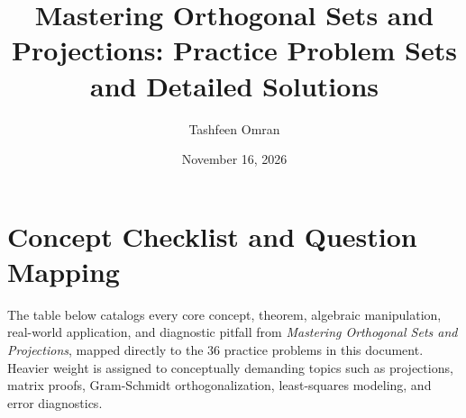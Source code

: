 \documentclass[11pt, letterpaper]{article}
\title{Mastering Orthogonal Sets and Projections: Practice Problem Sets and Detailed Solutions}
\author{Tashfeen Omran}
\date{November 16, 2026}
\theoremstyle{definition}
\theoremstyle{remark}
\begin{document}
\maketitle
\tableofcontents
\newpage

\section{Concept Checklist and Question Mapping}

The table below catalogs every core concept, theorem, algebraic manipulation, real-world application, and diagnostic pitfall from \textit{Mastering Orthogonal Sets and Projections}, mapped directly to the $36$ practice problems in this document. Heavier weight is assigned to conceptually demanding topics such as projections, matrix proofs, Gram-Schmidt orthogonalization, least-squares modeling, and error diagnostics.
\end{document}
